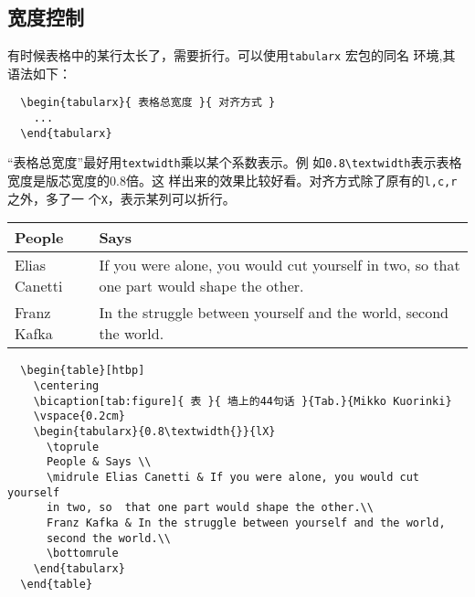 \subsection{宽度控制}

有时候表格中的某行太长了，需要折行。可以使用\texttt{tabularx} 宏包的同名
环境,其语法如下：

\begin{lstlisting}
  \begin{tabularx}{ 表格总宽度 }{ 对齐方式 }
    ...
  \end{tabularx}
\end{lstlisting}

“表格总宽度”最好用\texttt{textwidth}乘以某个系数表示。例
如\texttt{0.8\textbackslash{textwidth}}表示表格宽度是版芯宽度的0.8倍。这
样出来的效果比较好看。对齐方式除了原有的\texttt{l,c,r}之外，多了一
个\texttt{X}，表示某列可以折行。

\begin{table}[htbp]
  \centering
  \vspace{0.2cm}
  \begin{tabularx}{0.8\textwidth{}}{lX}
    \toprule
    People & Says \\
    \midrule
    Elias Canetti & If you were alone, you would cut yourself in two, so
    that one part would shape the other.\\
    Franz Kafka & In the struggle between yourself and the world,
    second the world.\\
    \bottomrule
  \end{tabularx}
\end{table}

\begin{lstlisting}
  \begin{table}[htbp]
    \centering
    \bicaption[tab:figure]{ 表 }{ 墙上的44句话 }{Tab.}{Mikko Kuorinki}
    \vspace{0.2cm}
    \begin{tabularx}{0.8\textwidth{}}{lX}
      \toprule
      People & Says \\
      \midrule Elias Canetti & If you were alone, you would cut yourself
      in two, so  that one part would shape the other.\\
      Franz Kafka & In the struggle between yourself and the world,
      second the world.\\
      \bottomrule
    \end{tabularx}
  \end{table}
\end{lstlisting}



